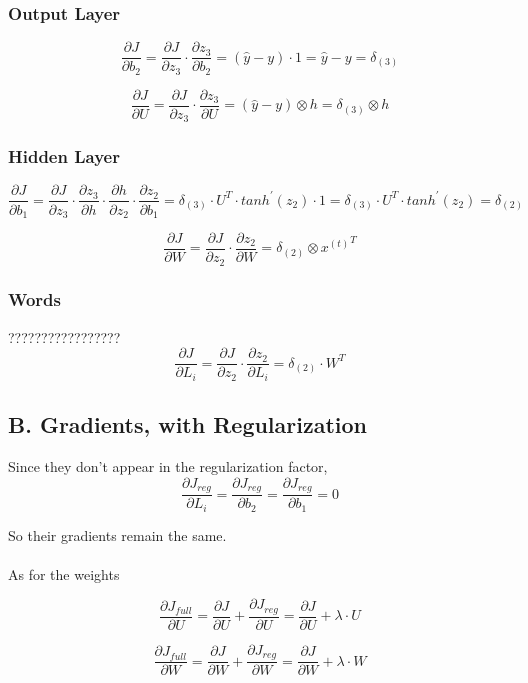 \documentclass{article}
\begin{document}
\subsubsection*{Output Layer}
$$
	\frac {\partial J}{\partial b_2} = \frac {\partial J}{\partial z_3} \cdot \frac {\partial z_3}{\partial b_2} = (\hat y - y) \cdot 1 = \hat y - y = \delta_{(3)}
$$

$$
	\frac {\partial J}{\partial U} = \frac {\partial J}{\partial z_3} \cdot \frac {\partial z_3}{\partial U} = (\hat y - y) \otimes h = \delta_{(3)} \otimes h
$$

\subsubsection*{Hidden Layer}
$$
	\frac {\partial J}{\partial b_1} = \frac {\partial J}{\partial z_3} \cdot \frac {\partial z_3}{\partial h} \cdot \frac {\partial h}{\partial z_2} \cdot \frac {\partial z_2}{\partial b_1} = \delta_{(3)} \cdot U^{T} \cdot tanh^{'}(z_2) \cdot 1= \delta_{(3)} \cdot U^{T} \cdot tanh^{'}(z_2) = \delta_{(2)}
$$

$$
	\frac {\partial J}{\partial W} = \frac {\partial J}{\partial z_2} \cdot \frac {\partial z_2}{\partial W} = \delta_{(2)} \otimes {x^{(t)}}^{T}
$$

\subsubsection*{Words}
?????????????????
$$
	\frac {\partial J}{\partial L_i} = \frac {\partial J}{\partial z_2} \cdot \frac {\partial z_2}{\partial L_i} = \delta_{(2)} \cdot {W}^{T}
$$

\subsection*{B. Gradients, with Regularization}
Since they don't appear in the regularization factor,
$$
	\frac {\partial J_{reg}}{\partial L_i} = \frac {\partial J_{reg}}{\partial b_2}  = \frac {\partial J_{reg}}{\partial b_1}  = 0
$$

So their gradients remain the same. \\~\\
As for the weights

$$
	\frac {\partial J_{full}}{\partial U} = \frac {\partial J}{\partial U} + \frac {\partial J_{reg}}{\partial U} = \frac {\partial J}{\partial U} +  \lambda \cdot U
$$

$$
	\frac {\partial J_{full}}{\partial W} = \frac {\partial J}{\partial W} + \frac {\partial J_{reg}}{\partial W} = \frac {\partial J}{\partial W} +  \lambda \cdot W
$$
\end{document}
